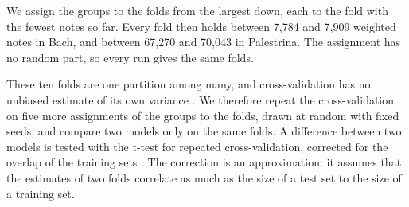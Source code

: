 We assign the groups to the folds from the largest down, each to the fold with the fewest notes so far. Every fold then holds between 7,784 and 7,909 weighted notes in Bach, and between 67,270 and 70,043 in Palestrina. The assignment has no random part, so every run gives the same folds.

These ten folds are one partition among many, and cross-validation has no unbiased estimate of its own variance \cite{bengio2004}. We therefore repeat the cross-validation on five more assignments of the groups to the folds, drawn at random with fixed seeds, and compare two models only on the same folds. A difference between two models is tested with the t-test for repeated cross-validation, corrected for the overlap of the training sets \cite{nadeau2003, bouckaert2004}. The correction is an approximation: it assumes that the estimates of two folds correlate as much as the size of a test set to the size of a training set.

